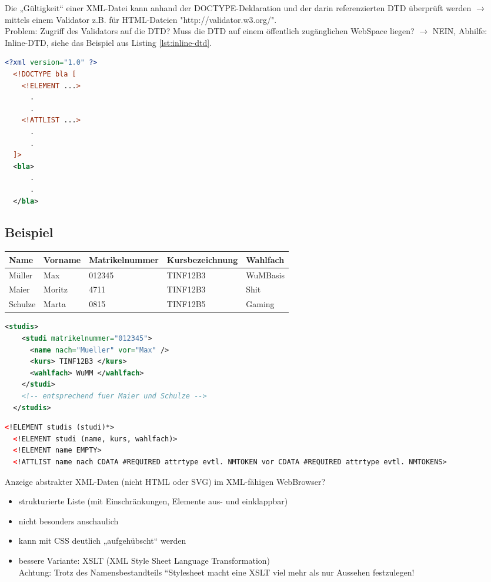 \newpage
Die „Gültigkeit“ einer XML-Datei kann anhand der DOCTYPE-Deklaration und der darin referenzierten DTD überprüft werden $\rightarrow$ mittels einem Validator z.B. für HTML-Dateien "http://validator.w3.org/".\\
Problem: Zugriff des Validators auf die DTD? Muss die DTD auf einem öffentlich zugänglichen WebSpace liegen? $\rightarrow$ NEIN, Abhilfe: Inline-DTD, siehe das Beispiel aus Listing \vref{lst:inline-dtd}.
\begin{lstlisting}[caption={Inline-DTD Beispiel}, label={lst:inline-dtd}, language={XML}]
  <?xml version="1.0" ?>
  <!DOCTYPE bla [
    <!ELEMENT ...>
      .
      .
    <!ATTLIST ...>
      .
      .
  ]>
  <bla>
      .     
      .
  </bla> 
\end{lstlisting}

\newpage
\subsection{Beispiel}
\begin{tabularx}{\textwidth}{l|l|l|l|X}
\textbf{Name}	& \textbf{Vorname}	& \textbf{Matrikelnummer}	& \textbf{Kursbezeichnung}	& \textbf{Wahlfach}\\\hline
Müller	& Max		& 012345	& TINF12B3	& WuMBasis\\
Maier	& Moritz	& 4711		& TINF12B3	& Shit\\
Schulze	& Marta		& 0815		& TINF12B5	& Gaming\\
\end{tabularx}	

\begin{lstlisting}[caption={Listeneinträge}, label={lst:inline-dtd}, language={XML}]
  <studis>
    <studi matrikelnummer="012345">
      <name nach="Mueller" vor="Max" />
      <kurs> TINF12B3 </kurs>
      <wahlfach> WuMM </wahlfach>
    </studi>
    <!-- entsprechend fuer Maier und Schulze -->
  </studis>
\end{lstlisting}

\begin{lstlisting}[caption={Baumerstellung per !ELEMENT}, label={lst:inline-dtd}, language={XML}]
  <!ELEMENT studis (studi)*>
  <!ELEMENT studi (name, kurs, wahlfach)>
  <!ELEMENT name EMPTY>
  <!ATTLIST name nach CDATA #REQUIRED attrtype evtl. NMTOKEN vor CDATA #REQUIRED attrtype evtl. NMTOKENS>
\end{lstlisting}

Anzeige abstrakter XML-Daten (nicht HTML oder SVG) im XML-fähigen WebBrowser?
\begin{itemize}
\item strukturierte Liste (mit Einschränkungen, Elemente aus- und einklappbar)
\item nicht besonders anschaulich
\item kann mit CSS deutlich „aufgehübscht“ werden
\item bessere Variante: XSLT (XML Style Sheet Language Transformation)\\
Achtung: Trotz des Namensbestandteils “Stylesheet macht eine XSLT viel mehr als nur Aussehen festzulegen!
\end{itemize}